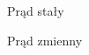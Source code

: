 \documentclass[11pt]{article}
\begin{document}
\newpage
\begin{center}



Prąd stały


Prąd zmienny
\end{center}
\end{document}
